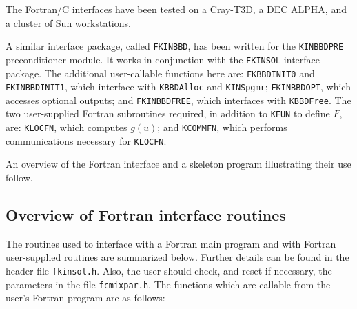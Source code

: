 \documentclass[11pt]{article}
\begin{document}
The Fortran/C interfaces have been tested on a Cray-T3D, a DEC ALPHA, and a 
cluster of Sun workstations.

A similar interface package, called {\tt FKINBBD}, has been written for the 
{\tt KINBBDPRE} preconditioner module. It works in conjunction with the
{\tt FKINSOL} interface package. The additional user-callable functions 
here are: {\tt FKBBDINIT0} and {\tt FKINBBDINIT1}, which interface with 
{\tt KBBDAlloc} and {\tt KINSpgmr};
{\tt FKINBBDOPT}, which accesses optional outputs; and {\tt FKINBBDFREE}, which
interfaces with {\tt KBBDFree}. The two user-supplied Fortran subroutines
required, in addition to {\tt KFUN} to define $F$, are: {\tt KLOCFN}, which
computes $g(u)$; and {\tt KCOMMFN}, which performs communications necessary
for {\tt KLOCFN}.

An overview of the Fortran interface and a skeleton program illustrating their
use follow.

\subsection{Overview of Fortran interface routines}

The routines used to interface with a Fortran main program and with Fortran
user-supplied routines are summarized below.  Further details can be
found in the header file {\tt fkinsol.h}.  Also, the user should check,
and reset if necessary, the parameters in the file {\tt fcmixpar.h}.
The functions which are callable from the user's Fortran program are
as follows:
\end{document}

